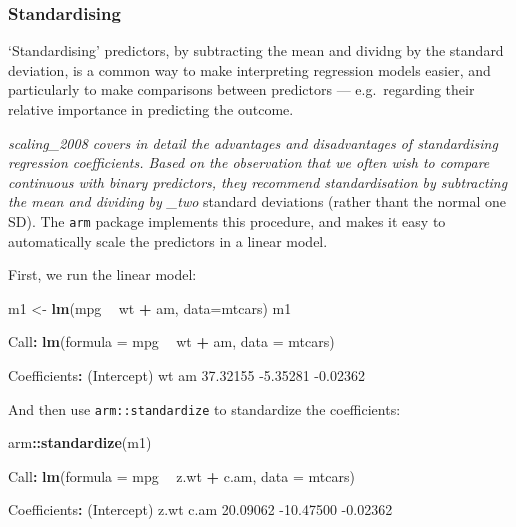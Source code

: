 \documentclass[]{article}
\newenvironment{Shaded}{\begin{snugshade}}{\end{snugshade}}
\newcommand{\DataTypeTok}[1]{\textcolor[rgb]{0.13,0.29,0.53}{#1}}
\newcommand{\FloatTok}[1]{\textcolor[rgb]{0.00,0.00,0.81}{#1}}
\newcommand{\KeywordTok}[1]{\textcolor[rgb]{0.13,0.29,0.53}{\textbf{#1}}}
\newcommand{\NormalTok}[1]{#1}
\newcommand{\OperatorTok}[1]{\textcolor[rgb]{0.81,0.36,0.00}{\textbf{#1}}}
\newcommand{\StringTok}[1]{\textcolor[rgb]{0.31,0.60,0.02}{#1}}
\begin{document}
\hypertarget{standardizing}{%
\subsubsection*{Standardising}\label{standardizing}}

`Standardising' predictors, by subtracting the mean and dividng by the standard
deviation, is a common way to make interpreting regression models easier, and
particularly to make comparisons between predictors --- e.g.~regarding their
relative importance in predicting the outcome.

\citet{gelman}\emph{scaling\_2008 covers in detail the advantages and disadvantages of
standardising regression coefficients. Based on the observation that we often
wish to compare continuous with binary predictors, they recommend
standardisation by subtracting the mean and dividing by \_two} standard
deviations (rather thant the normal one SD). The \texttt{arm} package implements this
procedure, and makes it easy to automatically scale the predictors in a linear
model.

First, we run the linear model:

\begin{Shaded}
\begin{Highlighting}[]
\NormalTok{m1 <-}\StringTok{ }\KeywordTok{lm}\NormalTok{(mpg }\OperatorTok{~}\StringTok{ }\NormalTok{wt }\OperatorTok{+}\StringTok{ }\NormalTok{am, }\DataTypeTok{data=}\NormalTok{mtcars)}
\NormalTok{m1}

\NormalTok{Call}\OperatorTok{:}
\KeywordTok{lm}\NormalTok{(}\DataTypeTok{formula =}\NormalTok{ mpg }\OperatorTok{~}\StringTok{ }\NormalTok{wt }\OperatorTok{+}\StringTok{ }\NormalTok{am, }\DataTypeTok{data =}\NormalTok{ mtcars)}

\NormalTok{Coefficients}\OperatorTok{:}
\NormalTok{(Intercept)           wt           am  }
   \FloatTok{37.32155}     \FloatTok{-5.35281}     \FloatTok{-0.02362}  
\end{Highlighting}
\end{Shaded}

And then use \texttt{arm::standardize} to standardize the coefficients:

\begin{Shaded}
\begin{Highlighting}[]
\NormalTok{arm}\OperatorTok{::}\KeywordTok{standardize}\NormalTok{(m1)}

\NormalTok{Call}\OperatorTok{:}
\KeywordTok{lm}\NormalTok{(}\DataTypeTok{formula =}\NormalTok{ mpg }\OperatorTok{~}\StringTok{ }\NormalTok{z.wt }\OperatorTok{+}\StringTok{ }\NormalTok{c.am, }\DataTypeTok{data =}\NormalTok{ mtcars)}

\NormalTok{Coefficients}\OperatorTok{:}
\NormalTok{(Intercept)         z.wt         c.am  }
   \FloatTok{20.09062}    \FloatTok{-10.47500}     \FloatTok{-0.02362}  
\end{Highlighting}
\end{Shaded}
\end{document}

